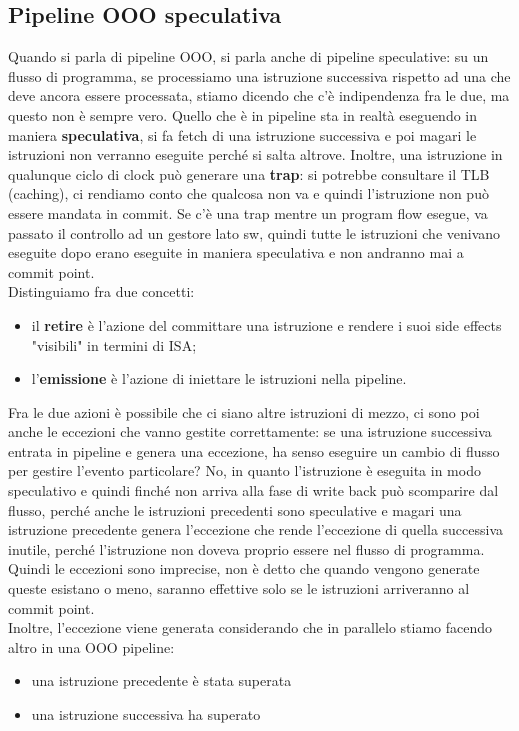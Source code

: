 \documentclass[12pt, oneside]{extbook}
\begin{document}
\subsection{Pipeline OOO speculativa}
Quando si parla di pipeline OOO, si parla anche di pipeline speculative: su un flusso di programma, se processiamo una istruzione successiva rispetto ad una che deve ancora essere processata, stiamo dicendo che c'è indipendenza fra le due, ma questo non è sempre vero. Quello che è in pipeline sta in realtà eseguendo in maniera \textbf{speculativa}, si fa fetch di una istruzione successiva e poi magari le istruzioni non verranno eseguite perché si salta altrove. Inoltre, una istruzione in qualunque ciclo di clock può generare una \textbf{trap}: si potrebbe consultare il TLB (caching), ci rendiamo conto che qualcosa non va e quindi l'istruzione non può essere mandata in commit. Se c'è una trap mentre un program flow esegue, va passato il controllo ad un gestore lato sw, quindi tutte le istruzioni che venivano eseguite dopo erano eseguite in maniera speculativa e non andranno mai a commit point.\\ Distinguiamo fra due concetti:
\begin{itemize}
\item il \textbf{retire} è l'azione del committare una istruzione e rendere i suoi side effects "visibili" in termini di ISA;
\item l'\textbf{emissione} è l'azione di iniettare le istruzioni nella pipeline.
\end{itemize}
Fra le due azioni è possibile che ci siano altre istruzioni di mezzo, ci sono poi anche le eccezioni che vanno gestite correttamente: se una istruzione successiva entrata in pipeline e genera una eccezione, ha senso eseguire un cambio di flusso per gestire l'evento particolare? No, in quanto l'istruzione è eseguita in modo speculativo e quindi finché non arriva alla fase di write back può scomparire dal flusso, perché anche le istruzioni precedenti sono speculative e magari una istruzione precedente genera l'eccezione che rende l'eccezione di quella successiva inutile, perché l'istruzione non doveva proprio essere nel flusso di programma.\\ Quindi le eccezioni sono imprecise, non è detto che quando vengono generate queste esistano o meno, saranno effettive solo se le istruzioni arriveranno al commit point.\\ Inoltre, l'eccezione viene generata considerando che in parallelo stiamo facendo altro in una OOO pipeline:
\begin{itemize}
\item una istruzione precedente è stata superata
\item una istruzione successiva ha superato
\end{itemize}
\end{document}
